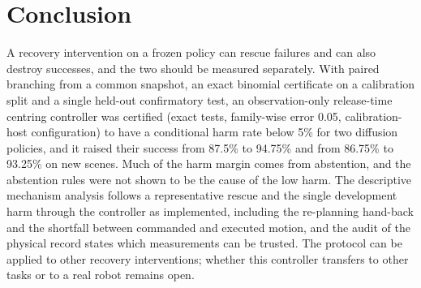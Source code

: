 \section{Conclusion}\label{sec:conclusion}

A recovery intervention on a frozen policy can rescue failures and can also destroy successes, and the two should be measured separately. With paired branching from a common snapshot, an exact binomial certificate on a calibration split and a single held-out confirmatory test, an observation-only release-time centring controller was certified (exact tests, family-wise error 0.05, calibration-host configuration) to have a conditional harm rate below 5\% for two diffusion policies, and it raised their success from 87.5\% to 94.75\% and from 86.75\% to 93.25\% on new scenes. Much of the harm margin comes from abstention, and the abstention rules were not shown to be the cause of the low harm. The descriptive mechanism analysis follows a representative rescue and the single development harm through the controller as implemented, including the re-planning hand-back and the shortfall between commanded and executed motion, and the audit of the physical record states which measurements can be trusted. The protocol can be applied to other recovery interventions; whether this controller transfers to other tasks or to a real robot remains open.
